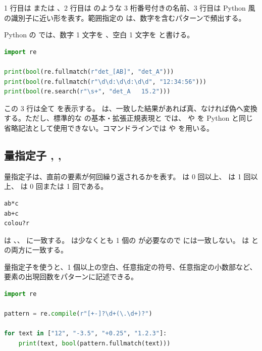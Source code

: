1 行目は  または 、2 行目は  のような 3 桁番号付きの名前、3 行目は Python 風の識別子に近い形を表す。範囲指定の \code{[0-9]} は、数字を含むパターンで頻出する。

Python の  では、数字 1 文字を 、空白 1 文字を  と書ける。

\begin{lstlisting}[language=Python]
import re

print(bool(re.fullmatch(r"det_[AB]", "det_A")))
print(bool(re.fullmatch(r"\d\d:\d\d:\d\d", "12:34:56")))
print(bool(re.search(r"\s+", "det_A   15.2")))
\end{lstlisting}

この 3 行は全て  を表示する。 は、一致した結果があれば真、なければ偽へ変換する。ただし、標準的な  の基本・拡張正規表現と  では、 や  を Python と同じ省略記法として使用できない。コマンドラインでは \code{[0-9]} や \code{[[:space:]]} を用いる。

\subsection{量指定子 \code{*}, \code{+}, }

量指定子は、直前の要素が何回繰り返されるかを表す。\code{*} は 0 回以上、\code{+} は 1 回以上、 は 0 回または 1 回である。

\begin{lstlisting}[numbers=none, xleftmargin=2\zw]
ab*c
ab+c
colou?r
\end{lstlisting}

 は 、、 に一致する。 は少なくとも 1 個の  が必要なので  には一致しない。 は  と  の両方に一致する。

量指定子を使うと、1 個以上の空白、任意指定の符号、任意指定の小数部など、要素の出現回数をパターンに記述できる。

\begin{lstlisting}[language=Python]
import re

pattern = re.compile(r"[+-]?\d+(\.\d+)?")

for text in ["12", "-3.5", "+0.25", "1.2.3"]:
    print(text, bool(pattern.fullmatch(text)))
\end{lstlisting}

